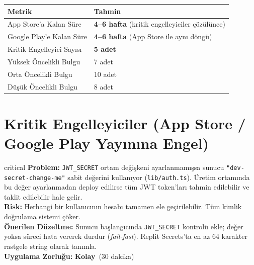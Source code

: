 \documentclass[12pt,a4paper]{article}
\newcommand{\EASY}{\textcolor{low}{\textbf{Kolay}}}
\begin{document}
\vspace{0.6em}
\begin{tabularx}{\textwidth}{lX}
  \toprule
  \textbf{Metrik} & \textbf{Tahmin} \\
  \midrule
  App Store'a Kalan Süre & \textbf{4--6 hafta} (kritik engelleyiciler çözülünce) \\
  Google Play'e Kalan Süre & \textbf{4--6 hafta} (App Store ile aynı döngü) \\
  Kritik Engelleyici Sayısı & \textbf{5 adet} \\
  Yüksek Öncelikli Bulgu & 7 adet \\
  Orta Öncelikli Bulgu & 10 adet \\
  Düşük Öncelikli Bulgu & 8 adet \\
  \bottomrule
\end{tabularx}

\section{Kritik Engelleyiciler (App Store / Google Play Yayınına Engel)}

\begin{auditbox}{critical}
\textbf{Problem:} \texttt{JWT\_SECRET} ortam değişkeni ayarlanmamışsa sunucu \texttt{"dev-secret-change-me"} sabit değerini kullanıyor (\texttt{lib/auth.ts}). Üretim ortamında bu değer ayarlanmadan deploy edilirse tüm JWT token'ları tahmin edilebilir ve taklit edilebilir hale gelir.\\[0.3em]
\textbf{Risk:} Herhangi bir kullanıcının hesabı tamamen ele geçirilebilir. Tüm kimlik doğrulama sistemi çöker.\\[0.3em]
\textbf{Önerilen Düzeltme:} Sunucu başlangıcında \texttt{JWT\_SECRET} kontrolü ekle; değer yoksa süreci hata vererek durdur (\textit{fail-fast}). Replit Secrets'ta en az 64 karakter rastgele string olarak tanımla.\\[0.3em]
\textbf{Uygulama Zorluğu:} \EASY\ (30 dakika)
\end{auditbox}
\end{document}

